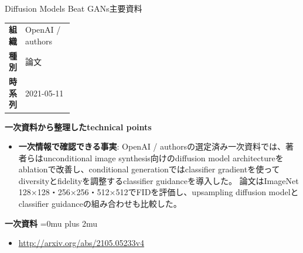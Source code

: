 \begin{technicalnote}{Diffusion Models Beat GANs}{主要資料}
\begingroup
\begin{tabularx}{\linewidth}{@{}>{\bfseries}p{0.22\linewidth}X@{}}
組織 & OpenAI / authors \\
種別 & 論文 \\
時系列 & 2021-05-11 \\
\end{tabularx}
\smallskip
\begin{minipage}{\linewidth}
{\bfseries 一次資料から整理したtechnical points}
\begin{itemize}[leftmargin=1.5em,itemsep=0.35em]
\item \textbf{一次情報で確認できる事実}: OpenAI / authorsの選定済み一次資料では、著者らはunconditional image synthesis向けのdiffusion model architectureをablationで改善し、conditional generationではclassifier gradientを使ってdiversityとfidelityを調整するclassifier guidanceを導入した。 論文はImageNet 128×128・256×256・512×512でFIDを評価し、upsampling diffusion modelとclassifier guidanceの組み合わせも比較した。
\end{itemize}
\begin{minipage}{\linewidth}
\begin{samepage}
{\bfseries 一次資料}
\begingroup\sloppy
\Urlmuskip=0mu plus 2mu\relax
\begin{itemize}[leftmargin=1.5em,itemsep=0.25em]
\item {\scriptsize\url{http://arxiv.org/abs/2105.05233v4}}
\end{itemize}
\endgroup
\end{samepage}
\end{minipage}
\end{minipage}
\endgroup
\end{technicalnote}
\medskip

